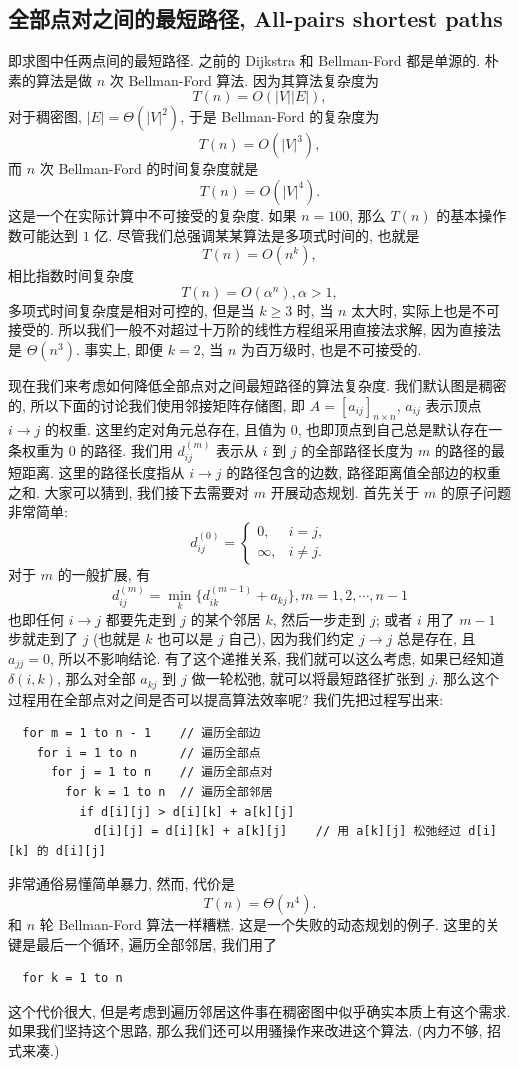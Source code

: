 \documentclass[a4paper]{ctexart}
\theoremstyle{definition}
\theoremstyle{definition}
\begin{document}
\subsection{全部点对之间的最短路径, All-pairs shortest paths}
即求图中任两点间的最短路径. 之前的 Dijkstra 和 Bellman-Ford 都是单源的. 朴素的算法是做 $n$ 
次 Bellman-Ford 算法. 因为其算法复杂度为
$$
T(n) = O(|V||E|), 
$$
对于稠密图, $|E| = \Theta(|V|^2)$, 于是 Bellman-Ford 的复杂度为
$$
T(n) = O(|V|^3),  
$$
而 $n$ 次 Bellman-Ford 的时间复杂度就是
$$
T(n) = O(|V|^4).
$$
这是一个在实际计算中不可接受的复杂度. 如果 $n = 100$, 那么 $T(n)$ 的基本操作数可能达到 $1$ 亿. 
尽管我们总强调某某算法是多项式时间的, 也就是 
$$
T(n) = O(n^k),
$$
相比指数时间复杂度 
$$
T(n) = O(\alpha^n), \alpha > 1,
$$
多项式时间复杂度是相对可控的, 但是当 $k \geq 3$ 时, 当 $n$ 太大时, 实际上也是不可接受的. 
所以我们一般不对超过十万阶的线性方程组采用直接法求解, 因为直接法是 $\Theta(n^3)$. 
事实上, 即便 $k = 2$, 当 $n$ 为百万级时, 也是不可接受的. 

现在我们来考虑如何降低全部点对之间最短路径的算法复杂度. 我们默认图是稠密的, 所以下面的讨论我们使用邻接矩阵存储图, 即
$A = [a_{ij}]_{n \times n}$, $a_{ij}$ 表示顶点 $i \to j$ 的权重. 这里约定对角元总存在, 且值为 $0$, 
也即顶点到自己总是默认存在一条权重为 $0$ 的路径. 我们用 $d^{(m)}_{ij}$ 表示从 $i$ 到 $j$
的全部路径长度为 $m$ 的路径的最短距离. 这里的路径长度指从 $i \to j$ 的路径包含的边数, 路径距离值全部边的权重之和.
大家可以猜到, 我们接下去需要对 $m$ 开展动态规划. 首先关于 $m$ 的原子问题非常简单:
$$
d^{(0)}_{ij} = \left\{\begin{array}{ll}
  0, & i = j, \\
  \infty, & i \neq j.
\end{array}\right.
$$
对于 $m$ 的一般扩展, 有
$$
d^{(m)}_{ij} = \min_k \{d^{(m - 1)}_{ik} + a_{kj}\}, m = 1, 2, \cdots, n - 1
$$
也即任何 $i \to j$ 都要先走到 $j$ 的某个邻居 $k$, 然后一步走到 $j$; 或者 $i$ 用了 $m - 1$ 步就走到了 $j$ 
(也就是 $k$ 也可以是 $j$ 自己), 因为我们约定 $j \to j$ 总是存在, 且 $a_{jj} = 0$, 所以不影响结论.
有了这个递推关系, 我们就可以这么考虑, 如果已经知道 $\delta(i, k)$, 那么对全部 $a_{kj}$ 到 $j$ 做一轮松弛, 
就可以将最短路径扩张到 $j$. 那么这个过程用在全部点对之间是否可以提高算法效率呢? 我们先把过程写出来:
\begin{verbatim}
  for m = 1 to n - 1    // 遍历全部边
    for i = 1 to n      // 遍历全部点
      for j = 1 to n    // 遍历全部点对
        for k = 1 to n  // 遍历全部邻居
          if d[i][j] > d[i][k] + a[k][j]
            d[i][j] = d[i][k] + a[k][j]    // 用 a[k][j] 松弛经过 d[i][k] 的 d[i][j]
\end{verbatim} 
非常通俗易懂简单暴力, 然而, 代价是 
$$
T(n) = \Theta(n^4).
$$
和 $n$ 轮 Bellman-Ford 算法一样糟糕. 这是一个失败的动态规划的例子. 这里的关键是最后一个循环, 遍历全部邻居, 
我们用了 
\begin{verbatim}
  for k = 1 to n
\end{verbatim}
这个代价很大, 但是考虑到遍历邻居这件事在稠密图中似乎确实本质上有这个需求. 如果我们坚持这个思路, 
那么我们还可以用骚操作来改进这个算法. (内力不够, 招式来凑.)
\end{document}
